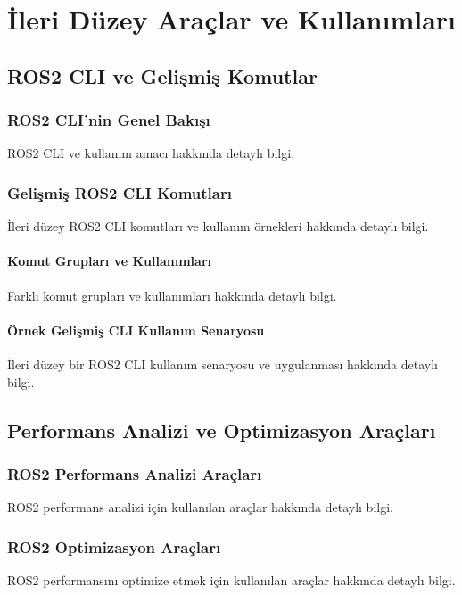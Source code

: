 \chapter{İleri Düzey Araçlar ve Kullanımları}

\section{ROS2 CLI ve Gelişmiş Komutlar}
\subsection{ROS2 CLI'nin Genel Bakışı}
ROS2 CLI ve kullanım amacı hakkında detaylı bilgi.

\subsection{Gelişmiş ROS2 CLI Komutları}
İleri düzey ROS2 CLI komutları ve kullanım örnekleri hakkında detaylı bilgi.

\subsubsection{Komut Grupları ve Kullanımları}
Farklı komut grupları ve kullanımları hakkında detaylı bilgi.

\subsubsection{Örnek Gelişmiş CLI Kullanım Senaryosu}
İleri düzey bir ROS2 CLI kullanım senaryosu ve uygulanması hakkında detaylı bilgi.

\section{Performans Analizi ve Optimizasyon Araçları}
\subsection{ROS2 Performans Analizi Araçları}
ROS2 performans analizi için kullanılan araçlar hakkında detaylı bilgi.

\subsection{ROS2 Optimizasyon Araçları}
ROS2 performansını optimize etmek için kullanılan araçlar hakkında detaylı bilgi.

